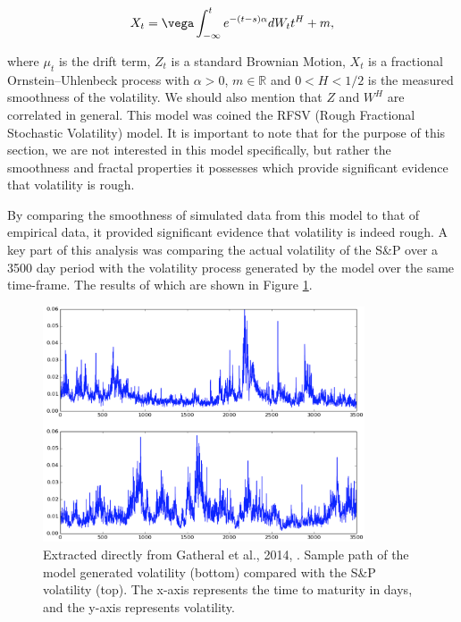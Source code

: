 \documentclass[12pt,oneside]{article}
\begin{document}
\begin{equation}
\label{eqn:OU_rough}
X_{t}=\vega\int_{-\infty}^{t} e^{-(t-s)\alpha}dW_{t}t^{H}+m,
\end{equation}

where $\mu_{t}$ is the drift term, $Z_{t}$ is a standard Brownian Motion, $X_{t}$ is a fractional Ornstein–Uhlenbeck process with $\alpha>0$, $m\in\mathbb{R}$ and $0<H<1/2$ is the measured smoothness of the volatility. We should also mention that $Z$ and $W^{H}$ are correlated in general. This model was coined the RFSV (Rough Fractional Stochastic Volatility) model. It is important to note that for the purpose of this section, we are not interested in this model specifically, but rather the smoothness and fractal properties it possesses which provide significant evidence that volatility is rough.

By comparing the smoothness of simulated data from this model to that of empirical data, it provided significant evidence that volatility is indeed rough. A key part of this analysis was comparing the actual volatility of the S\&P over a 3500 day period with the volatility process generated by the model over the same time-frame. The results of which are shown in Figure \ref{fig:gatheral_2014_volplots}.

\begin{figure}[htpb]

    \centering
    \includegraphics[width=0.85\textwidth ]{figs/gatheral_2014_fig36_p22}
    \caption{Extracted directly from Gatheral et al., 2014, \cite[Figure~3.6]{gatheral2014volatility}. Sample path of the model generated volatility (bottom) compared with the S\&P volatility (top). The x-axis represents the time to maturity in days, and the y-axis represents volatility.}
    \label{fig:gatheral_2014_volplots}
\end{figure}
\end{document}
